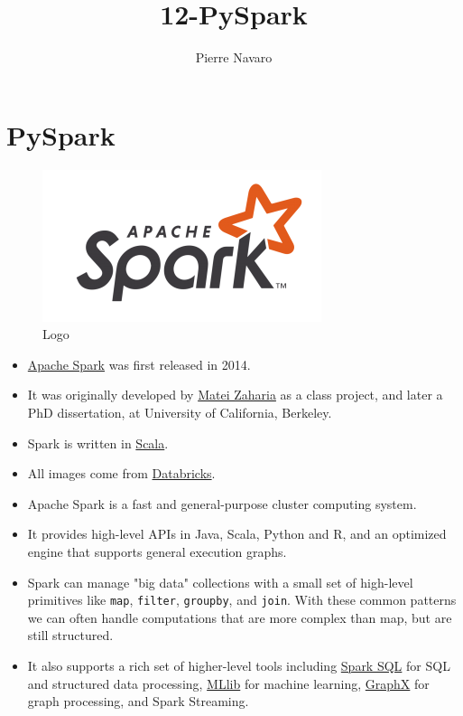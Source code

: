 \documentclass[11pt]{article}
\title{12-PySpark}
\author{Pierre Navaro}
\providecommand{\tightlist}{%
      \setlength{\itemsep}{0pt}\setlength{\parskip}{0pt}}
\begin{document}
    
    \maketitle
    
    

    
    \section{PySpark}\label{pyspark}

\begin{figure}
\centering
\includegraphics{images/apache_spark_logo.png}
\caption{Logo}
\end{figure}

    \begin{itemize}
\tightlist
\item
  \href{https://spark.apache.org}{Apache Spark} was first released in
  2014.
\item
  It was originally developed by
  \href{http://people.csail.mit.edu/matei}{Matei Zaharia} as a class
  project, and later a PhD dissertation, at University of California,
  Berkeley.
\item
  Spark is written in \href{https://www.scala-lang.org}{Scala}.
\item
  All images come from
  \href{https://databricks.com/product/getting-started-guide}{Databricks}.
\end{itemize}

    \begin{itemize}
\tightlist
\item
  Apache Spark is a fast and general-purpose cluster computing system.
\item
  It provides high-level APIs in Java, Scala, Python and R, and an
  optimized engine that supports general execution graphs.
\item
  Spark can manage "big data" collections with a small set of high-level
  primitives like \texttt{map}, \texttt{filter}, \texttt{groupby}, and
  \texttt{join}. With these common patterns we can often handle
  computations that are more complex than map, but are still structured.
\item
  It also supports a rich set of higher-level tools including
  \href{https://spark.apache.org/docs/latest/sql-programming-guide.html}{Spark
  SQL} for SQL and structured data processing,
  \href{https://spark.apache.org/docs/latest/ml-guide.html}{MLlib} for
  machine learning,
  \href{https://spark.apache.org/docs/latest/graphx-programming-guide.html}{GraphX}
  for graph processing, and Spark Streaming.
\end{itemize}
\end{document}
